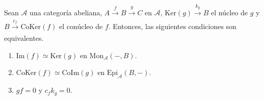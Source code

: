 \documentclass[tesis]{subfiles}
\begin{document}
\begin{Lema}\label{Mendoza-1.10.5}
    Sean $\mathscr{A}$ una categoría abeliana, $A\xrightarrow[]{f} B\xrightarrow[]{g}C$ en $\mathscr{A}$, $\text{Ker}(g)\xrightarrow[]{k_g}B$ el núcleo de $g$ y $B\xrightarrow[]{c_f} \text{CoKer}(f)$ el conúcleo de $f$. Entonces, las siguientes condiciones son equivalentes.

    \begin{enumerate}[label=(\alph*)]
    
        \item $\text{Im}(f)\simeq\text{Ker}(g)$ en $\text{Mon}_\mathscr{A}(-,B)$.

        \item $\text{CoKer}(f)\simeq \text{CoIm}(g)$ en $\text{Epi}_\mathscr{A}(B,-)$.

        \item $gf=0$ y $c_fk_g=0$.
    \end{enumerate}
\end{Lema}
\end{document}
